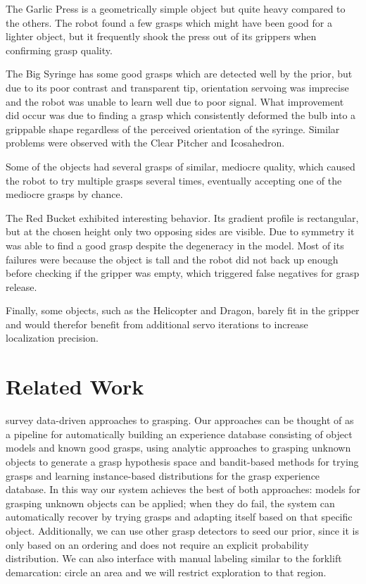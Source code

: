 \documentclass{article}
\begin{document}
The Garlic Press is a geometrically simple object but quite heavy compared to the others. The
robot found a few grasps which might have been good for a lighter object, but it frequently
shook the press out of its grippers when confirming grasp quality.

The Big Syringe has some good grasps which are detected well by the prior, but due to its poor
contrast and transparent tip, orientation servoing was imprecise and the robot was unable to
learn well due to poor signal. What improvement did occur was due to finding a grasp which
consistently deformed the bulb into a grippable shape regardless of the perceived orientation
of the syringe. Similar problems were observed with the Clear Pitcher and Icosahedron.

Some of the objects had several grasps of similar, mediocre quality, which
caused the robot to try multiple grasps several times, eventually accepting one of the
mediocre grasps by chance.

The Red Bucket exhibited interesting behavior. Its gradient profile is rectangular, but at the
chosen height only two opposing sides are visible. Due to symmetry it was able to find a good
grasp despite the degeneracy in the model. Most of its failures were because the object is tall
and the robot did not back up enough before checking if the gripper was empty, which triggered
false negatives for grasp release.

Finally, some objects, such as the Helicopter and Dragon, barely fit in the gripper and would
therefor benefit from additional servo iterations to increase localization precision. 

\section{Related Work}

\label{sec:relatedwork}

\citet{bohg13} survey data-driven approaches to grasping.  Our
approaches can be thought of as a pipeline for automatically building
an experience database consisting of object models and known good
grasps, using analytic approaches to grasping unknown objects to
generate a grasp hypothesis space and bandit-based methods for trying
grasps and learning instance-based distributions for the grasp
experience database.  In this way our system achieves the best of both
approaches: models for grasping unknown objects can be applied; when
they do fail, the system can automatically recover by trying
grasps and adapting itself based on that specific object. Additionally, we
can use other grasp detectors to seed our prior, since it is only based
on an ordering and does not require an explicit probability distribution.
We can also interface with manual labeling similar to the forklift demarcation:
circle an area and we will restrict exploration to that region.
\end{document}
